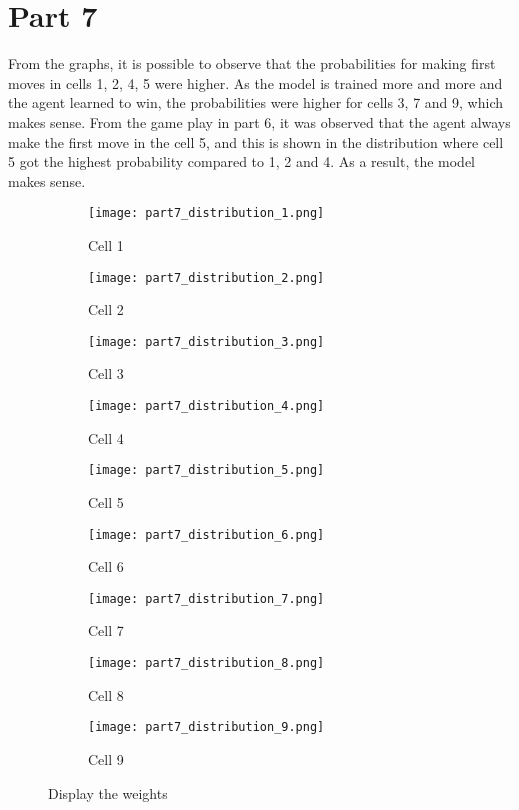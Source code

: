 \documentclass{article}
\newcommand{\enterProblemHeader}[1]{
}
\newcommand{\exitProblemHeader}[1]{
}
\newcounter{homeworkProblemCounter} %
\newcommand{\homeworkProblemName}{}
\newenvironment{homeworkProblem}[1][Problem \arabic{homeworkProblemCounter}]{ %
	\stepcounter{homeworkProblemCounter} %
	\renewcommand{\homeworkProblemName}{#1} %
	\section{\homeworkProblemName} %
	\enterProblemHeader{\homeworkProblemName} %
}{
	\exitProblemHeader{\homeworkProblemName} %
}
\begin{document}
	 
	\begin{homeworkProblem}[Part 7]
		
		From the graphs, it is possible to observe that the probabilities for making first moves in cells 1, 2, 4, 5 were higher. As the model is trained more and more and the agent learned to win, the probabilities were higher for cells 3, 7 and 9, which makes sense. From the game play in part 6, it was observed that the agent always make the first move in the cell 5, and this is shown in the distribution where cell 5 got the highest probability compared to 1, 2 and 4. As a result, the model makes sense. 
		
		
		
	\begin{figure*}[!h]
		\begin{subfigure}{.35\textwidth}
			\texttt{[image: part7\_distribution\_1.png]}
			\caption{Cell 1}
		\end{subfigure}
		\begin{subfigure}{.35\textwidth}
			\texttt{[image: part7\_distribution\_2.png]}
			\caption{Cell 2}
		\end{subfigure}
		\begin{subfigure}{.35\textwidth}
			\texttt{[image: part7\_distribution\_3.png]}
			\caption{Cell 3}%
		\end{subfigure}
		\begin{subfigure}{.35\textwidth}
			\texttt{[image: part7\_distribution\_4.png]}
			\caption{Cell 4}
		\end{subfigure}
		\begin{subfigure}{.35\textwidth}
			\texttt{[image: part7\_distribution\_5.png]}
			\caption{Cell 5}%
		\end{subfigure}
		\begin{subfigure}{.35\textwidth}
			\texttt{[image: part7\_distribution\_6.png]}
			\caption{Cell 6}%
		\end{subfigure}
		\begin{subfigure}{.35\textwidth}
			\texttt{[image: part7\_distribution\_7.png]}
			\caption{Cell 7}
		\end{subfigure}
		\begin{subfigure}{.35\textwidth}
			\texttt{[image: part7\_distribution\_8.png]}
			\caption{Cell 8}
		\end{subfigure}
		\begin{subfigure}{.35\textwidth}
			\texttt{[image: part7\_distribution\_9.png]}
			\caption{Cell 9}
		\end{subfigure}
		\caption{Display the weights}
		\label{Display the weights}
	\end{figure*}
	
	\end{homeworkProblem}
\end{document}
